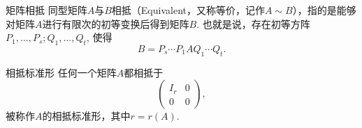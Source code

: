 \begin{frame}

\begin{block}{矩阵相抵}
同型矩阵$A$与$B$相抵（Equivalent，又称等价，记作$A\sim B$），指的是能够对矩阵$A$进行有限次的初等变换后得到矩阵$B$. 也就是说，存在初等方阵$P_1,\ldots,P_s;Q_1,\ldots,Q_t$, 使得
\[B = P_s \cdots P_1 A Q_1 \cdots Q_t.\]
\end{block}

\pause

\begin{block}{相抵标准形}
任何一个矩阵$A$都相抵于
\[\begin{pmatrix}
I_r & 0 \\ 0 & 0
\end{pmatrix},\]
被称作$A$的相抵标准形，其中$r = r(A)$.
\end{block}

\end{frame}


















